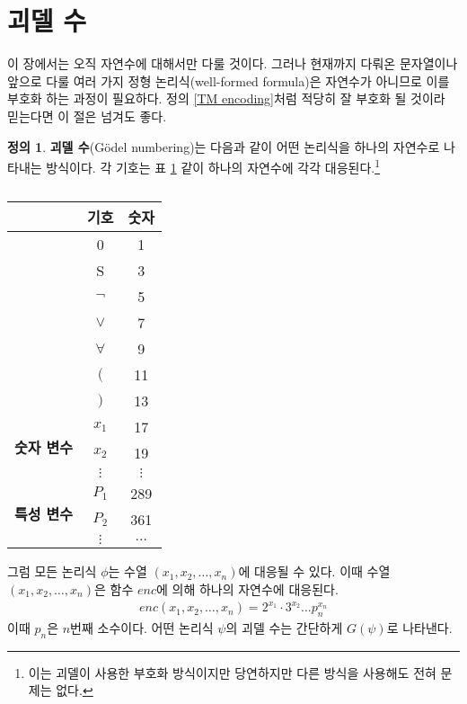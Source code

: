 \documentclass[b5paper, 11pt]{book}
\theoremstyle{definition}
\newtheorem{defn}{정의}[chapter]
\begin{document}
\section{괴델 수}
이 장에서는 오직 자연수에 대해서만 다룰 것이다. 그러나 현재까지 다뤄온 문자열이나 앞으로 다룰 여러 가지 정형 논리식(well-formed formula)은 자연수가 아니므로 이를 부호화 하는 과정이 필요하다. 정의 \ref{TM encoding}처럼 적당히 잘 부호화 될 것이라 믿는다면 이 절은 넘겨도 좋다.
\begin{defn}
    \textbf{괴델 수}(Gödel numbering)는 다음과 같이 어떤 논리식을
    하나의 자연수로 나타내는 방식이다. 각 기호는 표 \ref{godel encoding} 같이 하나의 자연수에 각각 대응된다.\footnote{이는 괴델이 사용한 부호화 방식이지만 당연하지만 다른 방식을 사용해도 전혀 문제는 없다.}
\begin{table}[h]
    \centering
    \begin{tabular}{|c|c|c|}
    \hline
    \textbf{}                        & \textbf{기호} & \textbf{숫자} \\ \hline
    \multirow{7}{*}{}                & 0           & 1           \\ \cline{2-3} 
                                     & S           & 3           \\ \cline{2-3} 
                                     & $\neg$      & 5           \\ \cline{2-3} 
                                     & $\vee$      & 7           \\ \cline{2-3} 
                                     & $\forall$   & 9           \\ \cline{2-3} 
                                     & $($         & 11          \\ \cline{2-3} 
                                     & $)$         & 13          \\ \hline
    \multirow{3}{*}{\textbf{숫자 변수}} & $x_1$       & 17          \\ \cline{2-3} 
                                     & $x_2$       & 19          \\ \cline{2-3} 
                                     & $\vdots$    & $\vdots$    \\ \hline
    \multirow{3}{*}{\textbf{특성 변수}}  & $P_1$       & 289         \\ \cline{2-3} 
                                     & $P_2$       & 361         \\ \cline{2-3} 
                                     & $\vdots$    & $\ldots$    \\ \hline
    \end{tabular}
    \caption{}
    \label{godel encoding}
    \end{table}
    그럼 모든 논리식 $\phi$는 수열 $(x_1, x_2, \ldots, x_n)$에 대응될 수 있다. 
    이때 수열 $(x_1, x_2 , \ldots, x_n)$은 함수 $enc$에 의해 하나의 자연수에 대응된다.
    \begin{align*}
        enc(x_1, x_2, \ldots, x_n) = 2^{x_1} \cdot 3^{x_2} \ldots p_n^{x_n}
    \end{align*} 
    이때 $p_n$은 $n$번째 소수이다. 어떤 논리식 $\psi$의 괴델 수는 간단하게 $G(\psi)$로 나타낸다.
\end{defn}
\end{document}
